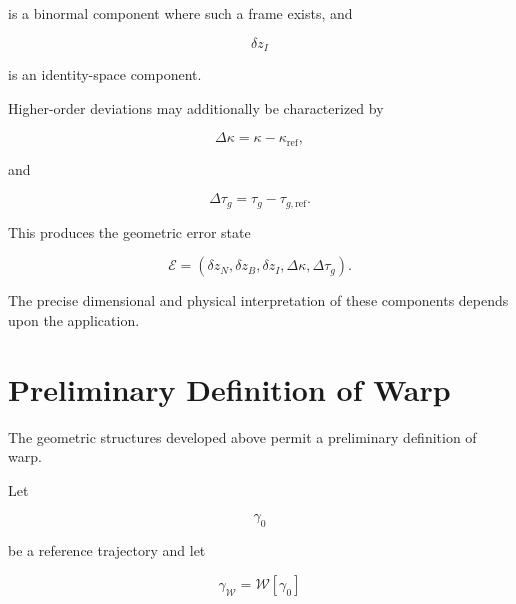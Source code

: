 \documentclass[12pt,oneside]{book}
\newcommand{\Warp}{\mathcal{W}}
\begin{document}
is a binormal component where such a frame exists, and

\begin{equation}
    \delta z_I
\end{equation}

is an identity-space component.

Higher-order deviations may additionally be characterized by

\begin{equation}
    \Delta\kappa
    =
    \kappa
    -
    \kappa_{\mathrm{ref}},
    \label{eq:curvature-deviation}
\end{equation}

and

\begin{equation}
    \Delta\tau_g
    =
    \tau_g
    -
    \tau_{g,\mathrm{ref}}.
    \label{eq:torsion-deviation}
\end{equation}

This produces the geometric error state

\begin{equation}
    \mathcal{E}
    =
    \left(
        \delta z_N,
        \delta z_B,
        \delta z_I,
        \Delta\kappa,
        \Delta\tau_g
    \right).
    \label{eq:geometric-error-state}
\end{equation}

The precise dimensional and physical interpretation of these
components depends upon the application.


\section{Preliminary Definition of Warp}
\label{sec:preliminary-warp-definition}

The geometric structures developed above permit a preliminary
definition of warp.

Let

\begin{equation}
    \gamma_0
\end{equation}

be a reference trajectory and let

\begin{equation}
    \gamma_{\Warp}
    =
    \Warp[\gamma_0]
    \label{eq:warp-transformation}
\end{equation}
\end{document}
